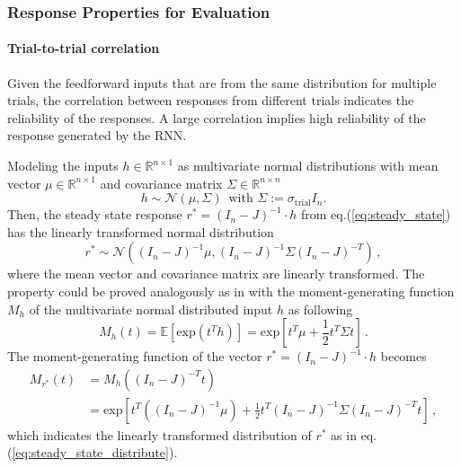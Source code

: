 \documentclass[11pt]{article}
\begin{document}
	\subsubsection{Response Properties for Evaluation} \label{sec:response_properties_for_evaluation}
	\paragraph{Trial-to-trial correlation} \label{para:ttc_sym}
	Given the feedforward inputs that are from the same distribution for multiple trials, the correlation between responses from different trials indicates the reliability of the responses. A large correlation implies high reliability of the response generated by the RNN. 
	
	Modeling the inputs $h \in \mathbb{R} ^{n \times 1}$ as multivariate normal distributions with mean vector $\mu \in \mathbb{R}^{n \times 1}$ and covariance matrix $\Sigma \in \mathbb{R}^{n \times n}$
		\begin{equation} \label{eq:input_distribution}
			h \sim \mathcal{N} (\mu, \Sigma) \, \text{ with } \Sigma := \sigma_{\text{trial}}I_n. 
		\end{equation}
	Then, the steady state response $r^* = (I_n - J)^{-1} \cdot h $ from eq.(\ref{eq:steady_state}) has the linearly transformed normal distribution
		\begin{equation} \label{eq:steady_state_distribute}
			r^* \sim \mathcal{N} \left((I_n - J)^{-1}\mu, (I_n - J)^{-1} \Sigma (I_n -J)^{-T}\right) \, ,
		\end{equation}
	where the mean vector and covariance matrix are linearly transformed. The property could be proved analogously as in \cite{Soch2019} with the moment-generating function $M_h$ of the multivariate normal distributed input $h$ as following
		\begin{equation}
			M_h(t) = \mathbb{E}\left[\text{exp}(t^Th)\right] = \text{exp} \left[t^T \mu + \frac{1}{2} t^T \Sigma t \right] \, .
		\end{equation}
	The moment-generating function of the vector $r^* = (I_n - J)^{-1} \cdot h$ becomes
		\begin{equation}
			\begin{split}
				M_{r^*}(t) & = M_h \left( (I_n-J)^{-T} t\right) \\
				        & = \text{exp} \left[
				         						t^T \left( (I_n - J)^{-1} \mu\right) + \frac{1}{2} t^T (I_n - J)^{-1} \Sigma (I_n - J)^{-T} t    
				         				\right] \, ,
			\end{split} 
		\end{equation}
	which indicates the linearly transformed distribution of $r^*$ as in eq.(\ref{eq:steady_state_distribute}).
	
\end{document}
